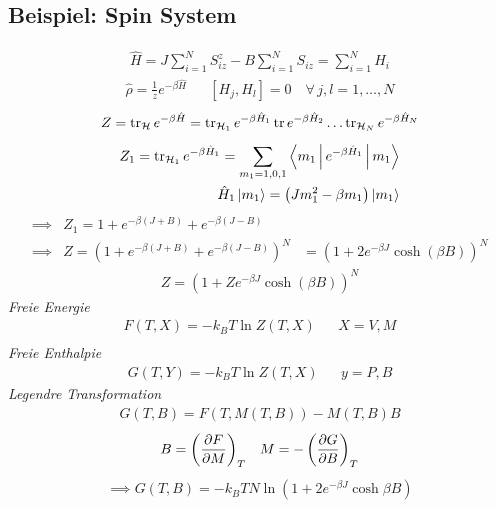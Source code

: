 \subsection*{Beispiel: Spin System}
%
\begin{align*}
  \hat{H} = J \sum_{i=1}^{N} S_{iz}^z - B \sum_{i=1}^{N} S_{iz} 
  = \sum_{i=1}^{N} H_i
\end{align*}
%
%
\begin{align*}
  \hat{\rho} = \frac{1}{z} e^{-\beta \hat{H}}  &&
  \left[ H_j, H_l \right] = 0 \quad\forall\, j,l = 1,\dotsc,N
\end{align*}
%
%
\begin{align*}
  Z = \operatorname{tr}_\mathcal{H} e^{-\beta \hat{H}} = \operatorname{tr}_{\mathcal{H}_1} e ^{-\beta \hat{H}_1} \operatorname{tr}
  e^{-\beta \hat{H}_2} \ldots \operatorname{tr}_{\mathcal{H}_N} e^{-\beta \hat{H}_N}
\end{align*}
%
%
\begin{align*}
  Z_1 = \operatorname{tr}_{\mathcal{H}_1} e^{-\beta \hat{H}_1} = \sum_{m_1=1,0,1}^{}
  \Braket{m_1 | e^{-\beta \hat{H}_1} | m_1} \\ \hat{H}_1 \Ket{m_1} = 
  \left( J m_1^2 - \beta m_1 \right) \Ket{m_1}
\end{align*}
%
%
\begin{align*}
  \implies & Z_1 = 1 + e^{-\beta (J+B)} + e^{-\beta (J-B)} \\
  \implies & Z = \left( 1 + e^{-\beta (J+B)} + e^{-\beta(J-B)} \right)^N
  & = \left( 1+2 e^{-\beta J} \cosh(\beta B) \right)^N
\end{align*}
%
%
\begin{align*}
  Z = \left( 1 + Z e ^{-\beta J} \cosh(\beta B) \right)^N 
\end{align*}
\emph{Freie Energie}
%
\begin{align*}
  F(T, X) = - k_B T \ln{Z (T, X)} && X = V, M \\
\end{align*}
\emph{Freie Enthalpie} 
%
\begin{align*}
  G (T, Y) = -k_B T \ln{Z(T, X)} && y = P, B
\end{align*}
\emph{Legendre Transformation}
%
\begin{align*}
  G(T, B) = F (T, M(T, B)) - M(T,B) B
\end{align*}
%
\begin{align*}
  B = \left( \frac{\partial F }{\partial M} \right)_T && M = - \left( \frac{\partial G }{\partial B} \right)_T
\end{align*}
%
%
\begin{align*}
  \implies G(T,B) = -k_B T N \ln{\left( 1+ 2 e^{- \beta J} \cosh{\beta B} \right)}
\end{align*}
%

